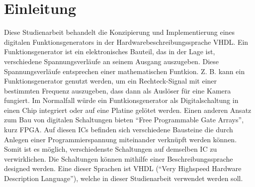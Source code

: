 \chapter[Einleitung]{Einleitung\raisebox{.3\baselineskip}{\normalsize \footnotemark}}

Diese Studienarbeit behandelt die Konzipierung und Implementierung eines
digitalen Funktionsgenerators in der Hardwarebeschreibungssprache VHDL.
Ein Funktionsgenerator ist ein elektronisches Bauteil, das in der Lage ist,
verschiedene Spannungsverläufe an seinem Ausgang auszugeben. Diese
Spannungsverläufe entsprechen einer mathematischen Funtkion. Z. B. kann ein
Funktionsgenerator genutzt werden, um ein Rechteck-Signal mit einer bestimmten
Frequenz auszugeben, dass dann als Auslöser für eine Kamera fungiert.
Im Normalfall würde ein Funtkionsgenerator als Digitalschaltung in einen Chip
integriert oder auf eine Platine gelötet werden. Einen anderen Ansatz zum Bau
von digitalen Schaltungen bieten ``Free Programmable Gate Arrays'', kurz FPGA.
Auf diesen ICs befinden sich verschiedene Bausteine die durch Anlegen einer
Programmierspannung miteinander verknüpft werden können. Somit ist es möglich,
verschiedenste Schaltungen auf demselben IC zu verwirklichen. Die Schaltungen
können mithilfe einer Beschreibungssprache designed werden. Eine dieser Sprachen
ist VHDL (``Very Highspeed Hardware Description Language''), welche in dieser
Studienarbeit verwendet werden soll. 

